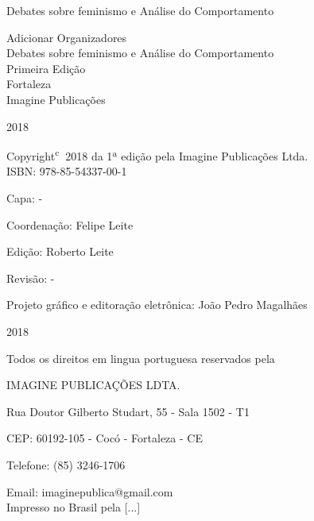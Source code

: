 \documentclass[hidelinks, 4pt]{bookest}
\let\orignewcommand\newcommand  %
\let\newcommand\providecommand  %
\let\newcommand\orignewcommand  %
\newcommand\blankpage{%
    \null
    \thispagestyle{empty}%
    \addtocounter{page}{-1}%
    \newpage}
\begin{document}
%
\begin{titlepage}
\begin{center}
\vspace*{\fill}
{\Huge Debates sobre feminismo e Análise do Comportamento}
\vspace*{\fill}
\pagebreak
\afterpage{\blankpage}
\end{center}
\begin{center}
{\Large Adicionar Organizadores}\\[4cm]
{\Huge Debates sobre feminismo e Análise do Comportamento}\\[4cm]

{\Large Primeira Edição}\\[3cm]


{\large Fortaleza\\
Imagine Publicações}

2018
\pagebreak
\thispagestyle{empty}
\end{center}
\pagebreak

Copyright\textsuperscript{\textcircled{c}} 2018 da 1ª edição pela Imagine Publicações Ltda.\\

ISBN: 978-85-54337-00-1

Capa: -

Coordenação: Felipe Leite

Edição: Roberto Leite

Revisão: -

Projeto gráfico e editoração eletrônica: João Pedro Magalhães\\
\vfill
\begin{center}
\end{center}

2018

Todos os direitos em lingua portuguesa reservados pela

IMAGINE PUBLICAÇÕES LDTA.

Rua Doutor Gilberto Studart, 55 - Sala 1502 - T1

CEP: 60192-105 - Cocó - Fortaleza - CE

Telefone: (85) 3246-1706

Email: imaginepublica@gmail.com\\

Impresso no Brasil pela [...]
\thispagestyle{empty}
\end{titlepage}












\end{document}
